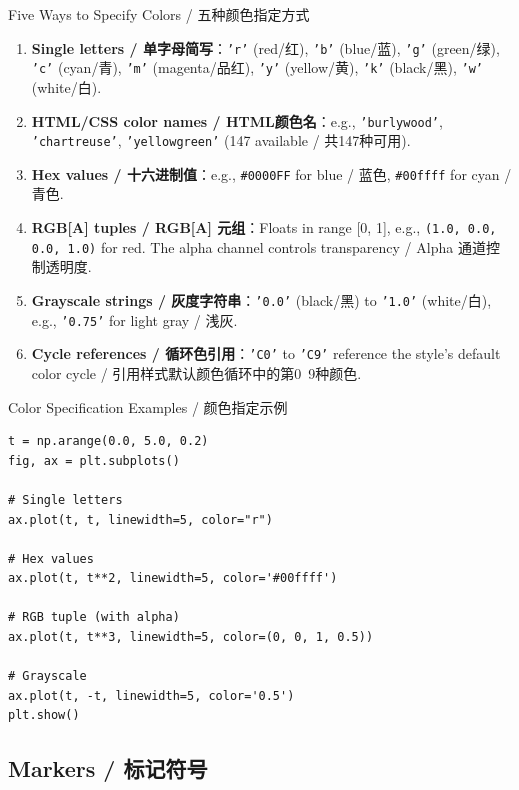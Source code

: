 \documentclass[11pt,a4paper]{report}
\let\oldtexttt\texttt
\renewcommand{\texttt}[1]{\textcolor{mainblue}{\oldtexttt{#1}}}
\begin{document}
\begin{concept}{Five Ways to Specify Colors / 五种颜色指定方式}
    \begin{enumerate}[itemsep=0.3em]
        \item \textbf{Single letters / 单字母简写}：\texttt{'r'} (red/红), \texttt{'b'} (blue/蓝), \texttt{'g'} (green/绿), \texttt{'c'} (cyan/青), \texttt{'m'} (magenta/品红), \texttt{'y'} (yellow/黄), \texttt{'k'} (black/黑), \texttt{'w'} (white/白).
        \item \textbf{HTML/CSS color names / HTML颜色名}：e.g., \texttt{'burlywood'}, \texttt{'chartreuse'}, \texttt{'yellowgreen'} (147 available / 共147种可用).
        \item \textbf{Hex values / 十六进制值}：e.g., \texttt{\#0000FF} for blue / 蓝色, \texttt{\#00ffff} for cyan / 青色.
        \item \textbf{RGB[A] tuples / RGB[A] 元组}：Floats in range [0, 1], e.g., \texttt{(1.0, 0.0, 0.0, 1.0)} for red. The alpha channel controls transparency / Alpha 通道控制透明度.
        \item \textbf{Grayscale strings / 灰度字符串}：\texttt{'0.0'} (black/黑) to \texttt{'1.0'} (white/白), e.g., \texttt{'0.75'} for light gray / 浅灰.
        \item \textbf{Cycle references / 循环色引用}：\texttt{'C0'} to \texttt{'C9'} reference the style's default color cycle / 引用样式默认颜色循环中的第0~9种颜色.
    \end{enumerate}
\end{concept}

\begin{examplebox}{Color Specification Examples / 颜色指定示例}
\begin{lstlisting}
t = np.arange(0.0, 5.0, 0.2)
fig, ax = plt.subplots()

# Single letters
ax.plot(t, t, linewidth=5, color="r")

# Hex values
ax.plot(t, t**2, linewidth=5, color='#00ffff')

# RGB tuple (with alpha)
ax.plot(t, t**3, linewidth=5, color=(0, 0, 1, 0.5))

# Grayscale
ax.plot(t, -t, linewidth=5, color='0.5')
plt.show()
\end{lstlisting}
\end{examplebox}

\subsection{Markers / 标记符号}
\end{document}
